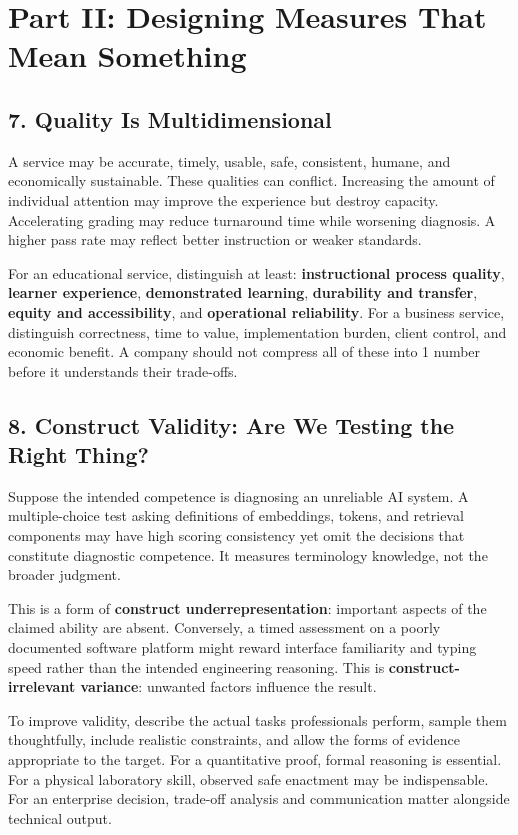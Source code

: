 \section*{Part II: Designing Measures That Mean Something}

\subsection*{7. Quality Is Multidimensional}

A service may be accurate, timely, usable, safe, consistent, humane, and economically sustainable. These qualities can conflict. Increasing the amount of individual attention may improve the experience but destroy capacity. Accelerating grading may reduce turnaround time while worsening diagnosis. A higher pass rate may reflect better instruction or weaker standards.

For an educational service, distinguish at least: \textbf{instructional process quality}, \textbf{learner experience}, \textbf{demonstrated learning}, \textbf{durability and transfer}, \textbf{equity and accessibility}, and \textbf{operational reliability}. For a business service, distinguish correctness, time to value, implementation burden, client control, and economic benefit. A company should not compress all of these into 1 number before it understands their trade-offs.

\subsection*{8. Construct Validity: Are We Testing the Right Thing?}

Suppose the intended competence is diagnosing an unreliable AI system. A multiple-choice test asking definitions of embeddings, tokens, and retrieval components may have high scoring consistency yet omit the decisions that constitute diagnostic competence. It measures terminology knowledge, not the broader judgment.

This is a form of \textbf{construct underrepresentation}: important aspects of the claimed ability are absent. Conversely, a timed assessment on a poorly documented software platform might reward interface familiarity and typing speed rather than the intended engineering reasoning. This is \textbf{construct-irrelevant variance}: unwanted factors influence the result.

To improve validity, describe the actual tasks professionals perform, sample them thoughtfully, include realistic constraints, and allow the forms of evidence appropriate to the target. For a quantitative proof, formal reasoning is essential. For a physical laboratory skill, observed safe enactment may be indispensable. For an enterprise decision, trade-off analysis and communication matter alongside technical output.

